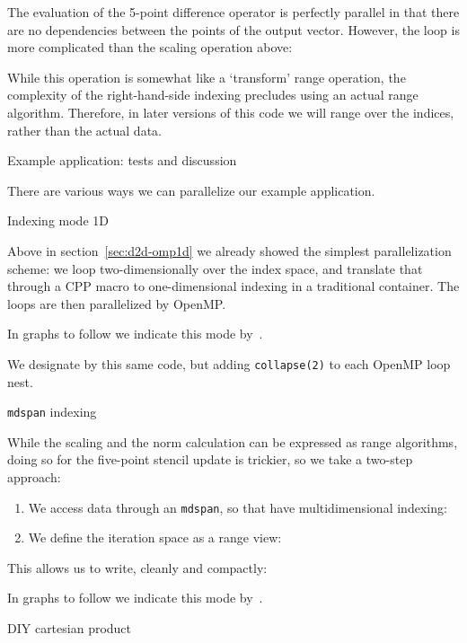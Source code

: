The evaluation of the 5-point difference operator is perfectly parallel
in that there are no dependencies between the points of the output vector.
However, the loop is more complicated than the scaling operation above:
%

While this operation is somewhat like a `transform' range operation,
the complexity of the right-hand-side indexing precludes using
an actual range algorithm.
Therefore, in later versions of this code we will range over
the indices, rather than the actual data.


 {Example application: tests and discussion}

There are various ways we can parallelize our example application.

 {Indexing mode 1D}

Above in section~\ref{sec:d2d-omp1d}
we already showed the simplest parallelization scheme:
we loop two-dimensionally over the index space,
and translate that through a \ac{CPP} macro
to one-dimensional indexing in a traditional container.
The loops are then parallelized by OpenMP.

In graphs to follow we indicate this mode by~.

We designate by  this same code, but adding
\lstinline{collapse(2)} to each OpenMP loop nest.

 {\texttt{mdspan} indexing}

While the scaling and the norm calculation can be expressed as range algorithms,
doing so for the five-point stencil update is trickier,
so we take a two-step approach:
\begin{enumerate}
\item We access data through an \lstinline{mdspan}, so that have multidimensional indexing:


\item We define the iteration space as a  range view:


\end{enumerate}
This allows us to write, cleanly and compactly:

In graphs to follow we indicate this mode by~.

 {DIY cartesian product}

